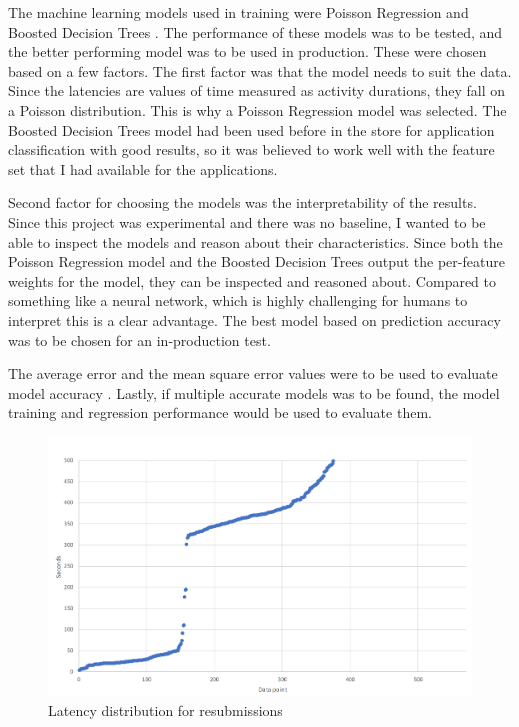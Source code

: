 The machine learning models used in training were Poisson Regression \cite{azurepoisson} and Boosted Decision Trees \cite{azurebdt}.
The performance of these models was to be tested, and the better performing model was to be used in production.
These were chosen based on a few factors.
The first factor was that the model needs to suit the data.
Since the latencies are values of time measured as activity durations, they fall on a Poisson distribution. 
This is why a Poisson Regression model was selected.
The Boosted Decision Trees model had been used before in the store for application classification with good results, so it was believed to work well with 
the feature set that I had available for the applications.

Second factor for choosing the models was the interpretability of the results.
Since this project was experimental and there was no baseline, I wanted to be able to inspect the models and reason about their characteristics.
Since both the Poisson Regression model and the Boosted Decision Trees output the per-feature weights for the model, they can be inspected and reasoned about.
Compared to something like a neural network, which is highly challenging for humans to interpret  this is a clear advantage.
The best model based on prediction accuracy was to be chosen for an in-production test.

The average error and the mean square error values were to be used to evaluate model accuracy .
Lastly, if multiple accurate models was to be found, the model training and regression performance would be used to evaluate them.

\begin{figure}[htb]
    \centering \includegraphics[width=0.6\linewidth]{gfx/resubmissions.png}
    \caption{Latency distribution for resubmissions }
    \label{fig:resubmissions}
\end{figure}

